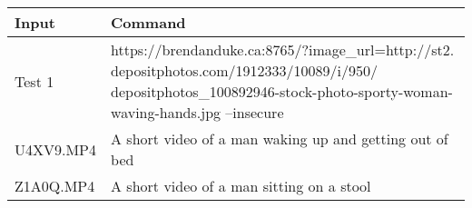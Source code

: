 \documentclass{scrreprt}
\begin{document}
\begin{table}[H]
        \centering
        \begin{tabular}{p{3cm}p{6cm}}
                \hline\hline
                Input & Command\\
                \hline\hline
                Test 1 &  https://brendanduke.ca:8765/?image_url=http://st2.
                depositphotos.com/1912333/10089/i/950/
                depositphotos_100892946-stock-photo-sporty-woman-waving-hands.jpg --insecure\\
                \hline
                U4XV9.MP4  &  A short video of a man waking up and getting out of bed\\
                \hline
                Z1A0Q.MP4 & A short video of a man sitting on a stool\\
                \hline
        \end{tabular}
\end{table}
\end{document}
